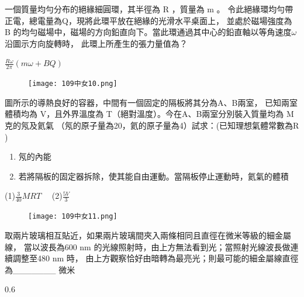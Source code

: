 \documentclass[cn,10pt,math=newtx]{elegantbook}
\begin{document}
\begin{example}
  一個質量均勻分布的絕緣細圓環，其半徑為 R ，質量為 m 。
  令此絕緣環均勻帶正電，總電量為Q，現將此環平放在絕緣的光滑水平桌面上，
  並處於磁場強度為 B 的均勻磁場中，磁場的方向鉛直向下。當此環通過其中心的鉛直軸以等角速度$\omega$沿圖示方向旋轉時，
  此環上所產生的張力量值為？\\
  \rightline{[台中女中教甄109]} 
\end{example}
\begin{solution}
  $\frac{R\omega}{2\pi}(m\omega+BQ)$
\end{solution}
\begin{figure}[htbp]
  \flushright
  \texttt{[image: 109中女10.png]}
\end{figure}
\newpage
\begin{example}
  圖所示的導熱良好的容器，中間有一個固定的隔板將其分為A、B兩室，
  已知兩室體積均為 V，且外界溫度為 T（絕對溫度）。今在A、B兩室分別裝入質量均為 M 克的氖及氦氣
 （氖的原子量為20，氦的原子量為4）試求：(已知理想氣體常數為R ) 
  \begin{enumerate}
    \item 氖的內能
    \item 若將隔板的固定器拆除，使其能自由運動。當隔板停止運動時，氦氣的體積
  \end{enumerate}
  
  \rightline{[台中女中教甄109]} 
\end{example}
\begin{solution}
  (1)$\frac{3}{40}MRT$ \ \ (2)$\frac{5V}{3}$
\end{solution}
\begin{figure}[htbp]
  \flushright
  \texttt{[image: 109中女11.png]}
\end{figure}
\newpage

\begin{example}
  取兩片玻璃相互貼近，如果兩片玻璃間夾入兩條相同且直徑在微米等級的細金屬線，
  當以波長為600 nm 的光線照射時，由上方無法看到光；當照射光線波長做連續調整至480 nm 時，
  由上方觀察恰好由暗轉為最亮光；則最可能的細金屬線直徑為\_\_\_\_\_\_\_ 微米\\
  \rightline{[台中女中教甄109]} 
\end{example}
\begin{solution}
  0.6
\end{solution}
\newpage
\end{document}
